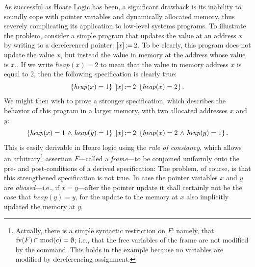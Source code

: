 \documentclass[11pt]{report}         %
\begin{document}
As successful as Hoare Logic has been, a significant drawback is its inability to soundly cope with pointer variables and dynamically allocated memory, thus severely complicating its application to low-level systems programs. To illustrate the problem, consider a simple program that updates the value at an address $x$ by writing to a dereferenced pointer: $\left[ x \right] \operatorname{:\!=} 2$. To be clearly, this program does not update the value $x$, but instead the value in memory at the address whose value is $x.$. If we write $\mathit{heap}(x) = 2$ to mean that the value in memory address $x$ is equal to 2, then the following specification is clearly true: \[ \left\lbrace \mathit{heap}(x) = 1 \right\rbrace\;\left[ x \right] \operatorname{:\!=} 2\;\left\lbrace \mathit{heap}(x)=2 \right\rbrace.\] We might then wish to prove a stronger specification, which describes the behavior of this program in a larger memory, with two allocated addresses $x$ and $y$: \[ \left\lbrace \mathit{heap}(x) = 1 \operatorname{\,\wedge\,} \mathit{heap}(y) = 1 \right\rbrace\;\left[ x \right] \operatorname{:\!=} 2\;\left\lbrace \mathit{heap}(x)=2 \operatorname{\,\wedge\,} \mathit{heap}(y) = 1 \right\rbrace. \] This is easily derivable in Hoare logic using the \emph{rule of constancy}, which allows an arbitrary\footnote{Actually, there is a simple syntactic restriction on $F$: namely, that $\mathrm{fv}(F) \cap \mathrm{mod}(c) = \operatorname{\emptyset}$; i.e., that the free variables of the frame are not modified by the command. This holds in the example because no variables are modified by dereferencing assignment.} assertion $F$---called a \emph{frame}---to be conjoined uniformly onto the pre- and post-conditions of a derived specification:  The problem, of course, is that this strengthened specification is not true. In case the pointer variables $x$ and $y$ are \emph{aliased}---i.e., if $x = y$---after the pointer update it shall certainly not be the case that $\mathit{heap}(y) = y$, for the update to the memory at $x$ also implicitly updated the memory at $y$. 
\end{document}
